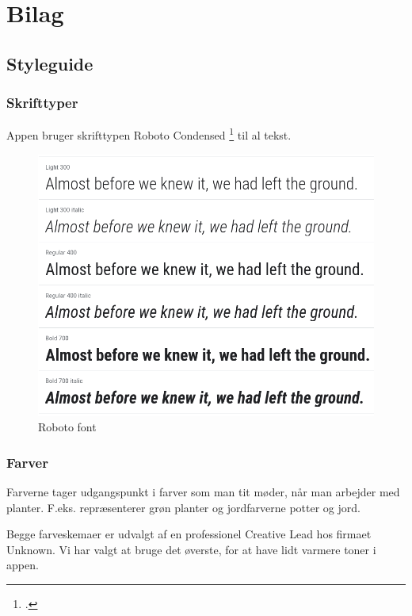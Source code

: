 \section{Bilag}

\subsection{Styleguide}
\label{styleguide}

\subsubsection*{Skrifttyper}

Appen bruger skrifttypen Roboto Condensed \footcite{roboto-condensed} til al tekst.

\begin{figure}[H]
    \label{font}
    \centering
    \includegraphics[width=1\textwidth]{img/s1-11.png}
    \caption{Roboto font}
\end{figure}

\subsubsection*{Farver}
Farverne tager udgangspunkt i farver som man tit møder, når man arbejder med planter. F.eks. repræsenterer grøn planter og jordfarverne potter og jord.

Begge farveskemaer er udvalgt af en professionel Creative Lead hos firmaet Unknown. Vi har valgt at bruge det øverste, for at have lidt varmere toner i appen.

